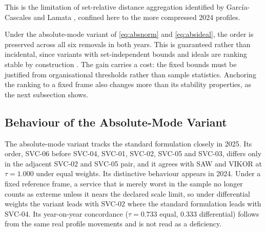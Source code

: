 \documentclass[
  journal,
]{IEEEtran}%
\begin{document}
\begin{table}

\caption{\label{tbl-rankreversal}Leave-one-out outcomes under standard
TOPSIS with equal weights (reordered results list the remaining services
from highest to lowest priority)}


\end{table}%

This is the limitation of set-relative distance aggregation identified
by García-Cascales and Lamata
, confined
here to the more compressed 2024 profiles.

Under the absolute-mode variant of \eqref{eq:absnorm} and
\eqref{eq:absideal}, the order is preserved across all six removals in
both years. This is guaranteed rather than incidental, since variants
with set-independent bounds and ideals are ranking stable by
construction . The
gain carries a cost: the fixed bounds must be justified from
organisational thresholds rather than sample statistics. Anchoring the
ranking to a fixed frame also changes more than its stability
properties, as the next subsection shows.

\subsection{Behaviour of the Absolute-Mode
Variant}\label{sec-absolutemode}

The absolute-mode variant tracks the standard formulation closely in
2025. Its order, SVC-06 before SVC-04, SVC-01, SVC-02, SVC-05 and
SVC-03, differs only in the adjacent SVC-02 and SVC-05 pair, and it
agrees with SAW and VIKOR at \(\tau = 1.000\) under equal weights. Its
distinctive behaviour appears in 2024. Under a fixed reference frame, a
service that is merely worst in the sample no longer counts as extreme
unless it nears the declared scale limit, so under differential weights
the variant leads with SVC-02 where the standard formulation leads with
SVC-04. Its year-on-year concordance (\(\tau = 0.733\) equal, \(0.333\)
differential) follows from the same real profile movements and is not
read as a deficiency.
\end{document}
